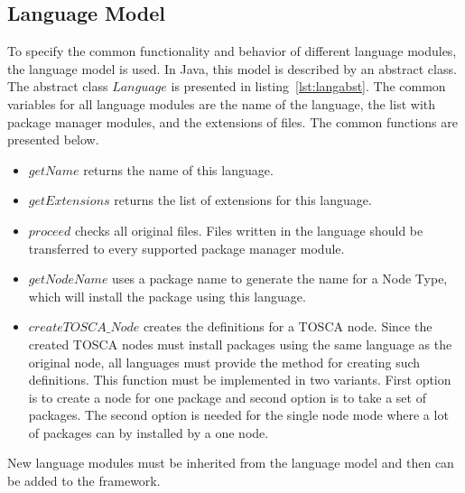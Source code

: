 \subsection*{Language Model}
To specify the common functionality and behavior of different language modules, the language model is used. 
In Java, this model is described by an abstract class. 
The abstract class $Language$ is presented in listing~\ref{lst:langabst}.
The common variables for all language modules are the name of the language, the list with package manager modules, and the extensions of files.
The common functions are presented below.
\begin{itemize}
	\item $getName$ returns the name of this language.
	\item $getExtensions$ returns the list of extensions for this language.
	\item $proceed$ checks all original files.  
	Files written in the language should be transferred to every supported package manager module.
	\item $getNodeName$ uses a package name to generate the name for a Node Type, which will install the package using this language.
	\item $createTOSCA\_Node$ creates the definitions for a TOSCA node. 
	Since the created TOSCA nodes must install packages using the same language as the original node, all languages must provide the method for creating such definitions.
	This function must be implemented in two variants. 
	First option is to create a node for one package and second option is to take a set of packages. 
	The second option is needed for the single node mode where a lot of packages can by installed by a one node.
\end{itemize}
New language modules must be inherited from the language model and then can be added to the framework.
